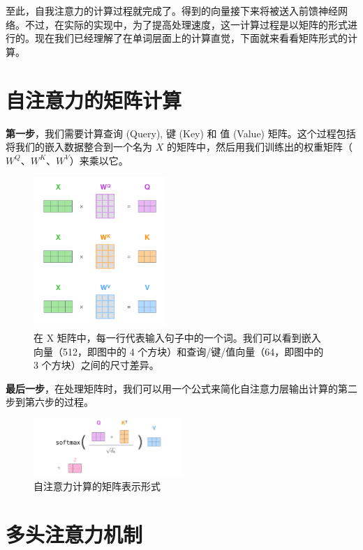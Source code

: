 \documentclass[cn,hazy,blue,10pt,normal]{elegantnote}
\begin{document}
至此，自我注意力的计算过程就完成了。得到的向量接下来将被送入前馈神经网络。不过，在实际的实现中，为了提高处理速度，这一计算过程是以矩阵的形式进行的。现在我们已经理解了在单词层面上的计算直觉，下面就来看看矩阵形式的计算。

\section{自注意力的矩阵计算}

\textbf{第一步}，我们需要计算查询 (Query), 键 (Key) 和 值 (Value) 矩阵。这个过程包括将我们的嵌入数据整合到一个名为 $X$ 的矩阵中，然后用我们训练出的权重矩阵（$W^Q$、$W^K$、$W^V$）来乘以它。

\begin{figure}[ht]
	\centering
	\includegraphics[width=0.45\textwidth]{image/self-attention-matrix-calculation.png}
	\caption{在 X 矩阵中，每一行代表输入句子中的一个词。我们可以看到嵌入向量（512，即图中的 4 个方块）和查询/键/值向量（64，即图中的 3 个方块）之间的尺寸差异。}
\end{figure}

\textbf{最后一步}，在处理矩阵时，我们可以用一个公式来简化自注意力层输出计算的第二步到第六步的过程。

\begin{figure}[ht]
	\vspace{-10mm}
	\centering
	\includegraphics[width=0.5\textwidth]{image/self-attention-matrix-calculation-2.png}
	\caption{自注意力计算的矩阵表示形式}
\end{figure}

\section{多头注意力机制}
\end{document}
